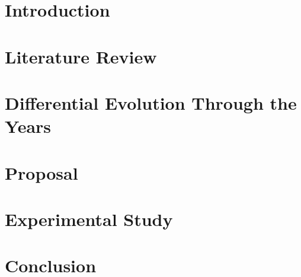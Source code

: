 \section{Introduction}
\label{sec:Introduction}


\section{Literature Review}
\label{sec:Literature}


\section{Differential Evolution Through the Years }
\label{sec:trends}


\section{Proposal}
\label{sec:Proposal}


\section{Experimental Study}
\label{sec:Experimental}


\section{Conclusion}
\label{sec:Conclusion}


